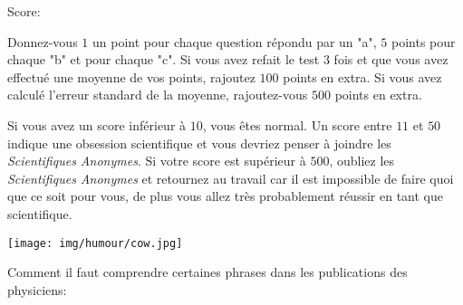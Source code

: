 Score:

Donnez-vous $1$ un point pour chaque question répondu par un "a", $5$ points pour chaque "b" et pour chaque "c". Si vous avez refait le test 3 fois et que vous avez effectué une moyenne de vos points, rajoutez $100$ points en extra. Si vous avez calculé l'erreur standard de la moyenne, rajoutez-vous $500$ points en extra.

Si vous avez un score inférieur à $10$, vous êtes normal. Un score entre $11$ et $50$ indique une obsession scientifique et vous devriez penser à joindre les \textit{Scientifiques Anonymes}. Si votre score est supérieur à $500$, oubliez les \textit{Scientifiques Anonymes} et retournez au travail car il est impossible de faire quoi que ce soit pour vous, de plus vous allez très probablement réussir en tant que scientifique.

\begin{center}\underline{\hspace{5 cm}}\end{center}

	\begin{center}
	\texttt{[image: img/humour/cow.jpg]}
	\end{center}
	
\pagebreak

Comment il faut comprendre certaines phrases dans les publications des physiciens:

